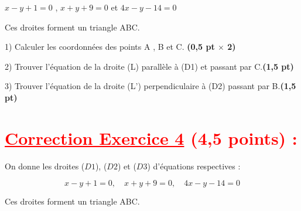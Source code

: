\documentclass[12pt]{article}
\begin{document}
\( x - y + 1 =0\) ,  \(x + y + 9 = 0\) et  	 \(4x - y - 14 = 0\)

    Ces droites forment un triangle ABC. 
    
    1) Calculer les coordonnées des points A , B et C. \textbf{(0,5 pt $\times$ 2)}
    
    2) Trouver l’équation de la droite (L) parallèle à (D1) et passant par C.\textbf{(1,5 pt)}
    
    3) Trouver l’équation de la droite (L’) perpendiculaire à (D2) passant par B.\textbf{(1,5 pt)}
\section*{\textcolor{red}{\underline{Correction Exercice 4} (4,5 points) :}}

On donne les droites (\(D1\)), (\(D2\)) et (\(D3\)) d’équations respectives :

\[ x - y + 1 = 0, \quad x + y + 9 = 0, \quad 4x - y - 14 = 0 \]

Ces droites forment un triangle ABC. 
\end{document}
